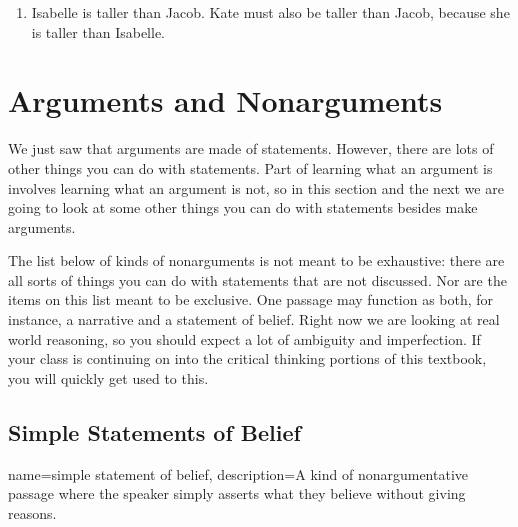 \begin{enumerate}[label=\arabic*), topsep=0pt, parsep=0pt, itemsep=6pt]
\item Isabelle is taller than Jacob. Kate must also be taller than Jacob, because she is taller than Isabelle. 

\end{enumerate}


\section{Arguments and Nonarguments}
\label{sec:arguments_and_nonarguments}

We just saw that arguments are made of statements. However, there are lots of other things you can do with statements. Part of learning what an argument is involves learning what an argument is not, so in this section and the next we are going to look at some other things you can do with statements besides make arguments. 

The list below of kinds of nonarguments is not meant to be exhaustive: there are all sorts of things you can do with statements that are not discussed. Nor are the items on this list meant to be exclusive. One passage may function as both, for instance, a narrative and a statement of belief. Right now we are looking at real world reasoning, so you should expect a lot of ambiguity and imperfection. If your class is continuing on into the critical thinking portions of this textbook, you will quickly get used to this. 

\subsection{Simple Statements of Belief}

{
name=simple statement of belief,
description={A kind of nonargumentative passage where the speaker simply asserts what they believe without giving reasons. }
}

